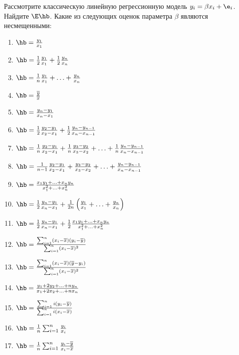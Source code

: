 \documentclass[pdftex,11pt,openany]{book}\usepackage[]{graphicx}\usepackage[]{color}
\begin{document}
\begin{problem}
 Рассмотрите классическую линейную регрессионную модель $y_i = \beta x_i + \e_i$. Найдите $\E \hb$. Какие из следующих оценок параметра $\beta$ являются несмещенными:

\begin{enumerate}
\item $\hb = \frac{y_1}{x_1}$
\item $\hb = \frac{1}{2} \frac{y_1}{x_1} + \frac{1}{2} \frac{y_n}{x_n}$
\item $\hb = \frac{1}{n}  \frac{y_1}{x_1} + \ldots + \frac{y_n}{x_n} $
\item $\hb = \frac{\overline{y}}{\overline{x}}$
\item $\hb = \frac{y_n - y_1}{x_n - x_1}$
\item $\hb = \frac{1}{2} \frac{y_2 - y_1}{x_2 - x_1} + \frac{1}{2} \frac{y_n - y_{n-1}}{x_n - x_{n-1}}$
\item $\hb = \frac{1}{n} \frac{y_2 - y_1}{x_2 - x_1} + \frac{1}{n} \frac{y_3 - y_2}{x_3 - x_2} + \ldots + \frac{1}{n} \frac{y_n - y_{n-1}}{x_n - x_{n-1}}$
\item $\hb = \frac{1}{n-1}  \frac{y_2 - y_1}{x_2 - x_1} + \frac{y_3 - y_2}{x_3 - x_2} + \ldots + \frac{y_n - y_{n-1}}{x_n - x_{n-1}} $
\item $\hb = \frac{x_1 y_1 + \ldots + x_n y_n}{x_1^2 + \ldots + x_n^2}$
\item $\hb = \frac{1}{2} \frac{y_n - y_1}{x_n - x_1} + \frac{1}{2n}  \left( \frac{y_1}{x_1} + \ldots + \frac{y_n}{x_n} \right) $
\item $\hb =  \frac{1}{2} \frac{y_n - y_1}{x_n - x_1} + \frac{1}{2} \frac{x_1 y_1 + \ldots + x_n y_n}{x_1^2 + \ldots + x_n^2}$
\item $\hb = \frac{\sum_{i=1}^n (x_i - \overline{x})(y_i - \overline{y})}{\sum_{i=1}^n (x_i - \overline{x})^2}$
\item $\hb = \frac{\sum_{i=1}^n (x_i - \overline{x})(\overline{y} - y_i)}{\sum_{i=1}^n (x_i - \overline{x})^2}$
\item $\hb = \frac{y_1 + 2 y_2 + \ldots + n y_n}{x_1 + 2 x_2 + \ldots + n x_n}$
\item $\hb = \frac{\sum_{i=1}^n i(y_i - \overline{y})}{\sum_{i=1}^n i(x_i - \overline{x})}$
\item $\hb = \frac{1}{n} \sum_{i=1}^n \frac{y_i}{x_i}$
\item $\hb = \frac{1}{n} \sum_{i=1}^n \frac{y_i - \overline{y}}{x_i - \overline{x}}$
\end{enumerate}
\end{problem}
\end{document}
